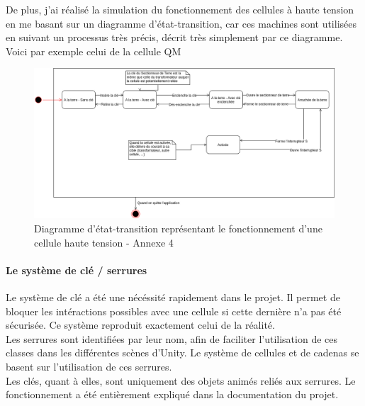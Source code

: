 \documentclass[a4paper]{article}
\begin{document}
    De plus, j'ai réalisé la simulation du fonctionnement des cellules à haute tension en me basant sur un diagramme d'état-transition, car ces machines sont utilisées en suivant un processus très précis, décrit très simplement par ce diagramme. Voici par exemple celui de la cellule QM \\

    \begin{figure}[H]
        \centering
        \includegraphics[scale=0.4]{img/DiagEtatTransitionQM}
        \caption{Diagramme d'état-transition représentant le fonctionnement d'une cellule haute tension - Annexe 4}
    \end{figure} 

    \paragraph{Le système de clé / serrures}

    Le système de clé a été une nécéssité rapidement dans le projet. Il permet de bloquer les intéractions possibles avec une cellule si cette dernière n'a pas été sécurisée. Ce système reproduit exactement celui de la réalité. \\

    Les serrures sont identifiées par leur nom, afin de faciliter l'utilisation de ces classes dans les différentes scènes d'Unity. Le système de cellules et de cadenas se basent sur l'utilisation de ces serrures. \\

    Les clés, quant à elles, sont uniquement des objets animés reliés aux serrures. 
    Le fonctionnement a été entièrement expliqué dans la documentation du projet. \\
    
\end{document}
